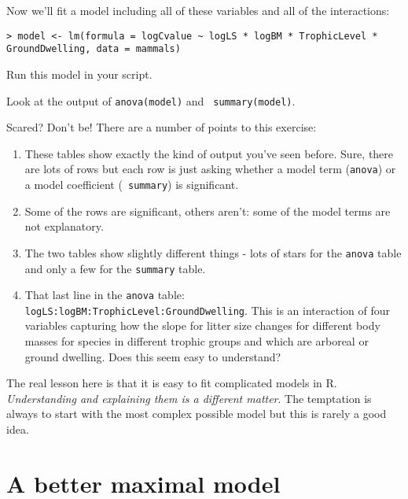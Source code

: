 Now we'll fit a model including all of these variables and all of the 
interactions:

\begin{lstlisting}
> model <- lm(formula = logCvalue ~ logLS * logBM * TrophicLevel * 
GroundDwelling, data = mammals)
\end{lstlisting}

\begin{compactitem}[$\quad\star$]
	\item Run this model in your script.
	\item Look at the output of {\tt anova(model)} and {\tt 
	summary(model)}.
\end{compactitem}

Scared? Don't be! There are a number of points to this exercise:
\begin{enumerate}

	\item These tables show exactly the kind of output you've seen 
	before. Sure, there are lots of rows but each row is just asking 
	whether a model term ({\tt anova}) or a model coefficient ({\tt 
	summary}) is significant.

	\item Some of the rows are significant, others aren't: some of the 
	model terms are not explanatory.

	\item The two tables show slightly different things - lots of stars 
	for the {\tt anova} table and only a few for the {\tt summary} table.

	\item That last line in the {\tt anova} table: {\tt 
	logLS:logBM:TrophicLevel:GroundDwelling}. This is an interaction of 
	four variables capturing how the slope for litter size changes for 
	different body masses for species in different trophic groups and 
	which are arboreal or ground dwelling. Does this seem easy to 
	understand?
\end{enumerate}

The real lesson here is that it is easy to fit complicated models in R. 
{\it Understanding and explaining them is a different matter}. The 
temptation is always to start with the most complex possible model but 
this is rarely a good idea.

\section{A better maximal model}

